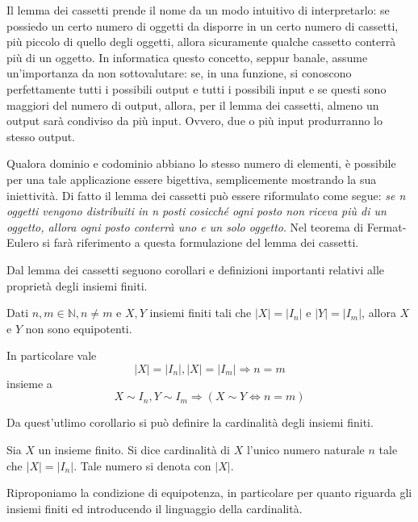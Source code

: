 Il lemma dei cassetti prende il nome da un modo intuitivo di interpretarlo:
se possiedo un certo numero di oggetti da disporre in un certo numero di
cassetti, più piccolo di quello degli oggetti, allora sicuramente qualche
cassetto conterrà più di un oggetto.
In informatica questo concetto, seppur banale, assume un'importanza da non
sottovalutare: se, in una funzione, si conoscono perfettamente tutti i possibili output e
tutti i possibili input e se questi sono maggiori del numero di output,
allora, per il lemma dei cassetti, almeno un output sarà condiviso da più
input. Ovvero, due o più input produrranno lo stesso output.

\begin{osservaz}
Qualora dominio e codominio abbiano lo stesso numero di elementi,
è possibile per una tale applicazione essere bigettiva, semplicemente
mostrando la sua iniettività. Di fatto il lemma dei cassetti può essere
riformulato come segue: \emph{se n oggetti vengono distribuiti in n posti
cosicché ogni posto non riceva più di un oggetto, allora ogni posto
conterrà uno e un solo oggetto}. Nel teorema di Fermat-Eulero
si farà riferimento a questa formulazione del
lemma dei cassetti.
\end{osservaz}

Dal lemma dei cassetti seguono corollari e definizioni importanti
relativi alle proprietà degli insiemi finiti.
\begin{tcolorbox}[colback=green!30, colframe=green!30!black, title={Equipotenza tra insiemi finiti}]
Dati $n,m\in\mathbb{N}, n\not=m$ e $X,Y$ insiemi finiti tali che $|X|=|I_n|$ e $|Y|=|I_m|$,
allora $X$ e $Y$ non sono equipotenti.

In particolare vale \[ |X|=|I_n|,|X|=|I_m| \Longrightarrow n=m \]
insieme a \[ X\sim I_n,Y\sim I_m \Longrightarrow (X\sim Y \Leftrightarrow n = m) \]
\end{tcolorbox}
Da quest'utlimo corollario si può definire la cardinalità degli insiemi
finiti.

\begin{tcolorbox}[colback=yellow!30, colframe=yellow!30!black, title={Cardinalità di un insieme finito}]
Sia $X$ un insieme finito. Si dice cardinalità di $X$ l'unico numero
naturale $n$ tale che $|X|=|I_n|$. Tale numero si denota con $|X|$.
\end{tcolorbox}

Riproponiamo la condizione di equipotenza, in particolare per quanto
riguarda gli insiemi finiti ed introducendo il linguaggio della cardinalità.

